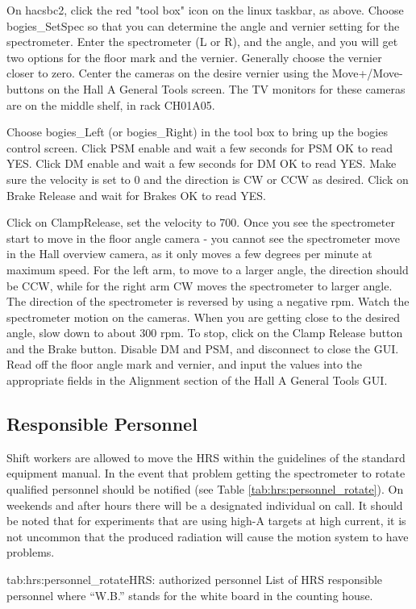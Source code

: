 {On hacsbc2, click the red "tool box" icon on the linux taskbar, as above. Choose 
bogies\_SetSpec so that you can determine the angle and vernier setting for the spectrometer.
Enter the spectrometer (L or R), and the angle, and you will get two options for the floor 
mark and the vernier. Generally choose the vernier closer to zero. Center the cameras on the 
desire vernier using the Move+/Move- buttons on the Hall A General Tools screen. The TV monitors 
for these cameras are on the middle shelf, in rack CH01A05.

Choose bogies\_Left (or bogies\_Right) in the tool box to bring up the bogies control screen. 
Click PSM enable and wait a few seconds for PSM OK to read YES. 
Click DM enable and wait a few seconds for DM OK to read YES.
Make sure the velocity is set to 0 and the direction is CW or CCW as desired. Click on Brake Release 
and wait for Brakes OK to read YES.

Click on ClampRelease, set the velocity to 700. Once you see the spectrometer start to move in the 
floor angle camera - you cannot see the spectrometer move in the Hall overview camera, as it only 
moves a few degrees per minute at maximum speed. For the left arm, to move to a larger angle, the 
direction should be CCW, while for the right arm CW moves the spectrometer to larger angle. The 
direction of the spectrometer is reversed by using a negative rpm. Watch the spectrometer motion 
on the cameras. When you are getting close to the desired angle, slow down to about 300 rpm. 
To stop, click on the Clamp Release button and the Brake button. Disable DM and PSM, and disconnect 
to close the GUI. Read off the floor angle mark and vernier, and input the values into the appropriate 
fields in the Alignment section of the Hall A General Tools GUI. 
}

\begin{safetyen}{0}{0}
\subsection{Responsible Personnel}

Shift workers are allowed to move the HRS within the guidelines of the standard equipment manual.
In the event that problem getting the spectrometer to rotate
qualified personnel should be notified
(see Table \ref{tab:hrs:personnel_rotate}).  
On weekends and after hours there will be a 
designated individual on call.
It should be noted that for experiments that are using high-A targets at high current, it is
not uncommon that the produced radiation will cause the motion system to have problems.

\begin{namestab}{tab:hrs:personnel_rotate}{HRS: authorized personnel}{%
      List of HRS responsible personnel where ``W.B.'' stands for the white board 
      in the counting house.}
   \EdFolts{}
   \JackSegal{}
   \HeidiFansler{}
   \JessieButler{}
   \AndrewLumanog{}
   \JasonGlorioso{}
   \MahlonLong{}
\end{namestab}

\end{safetyen}

